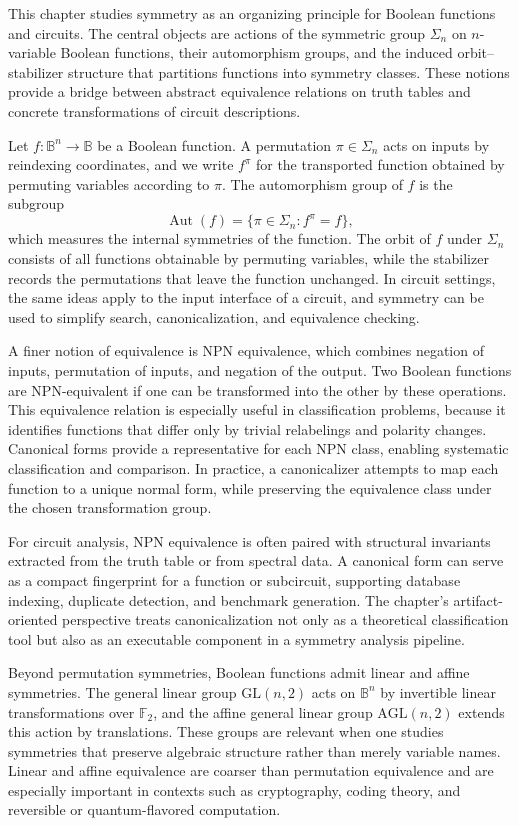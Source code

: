 This chapter studies symmetry as an organizing principle for Boolean functions and circuits. The central objects are actions of the symmetric group \(\Sigma_n\) on \(n\)-variable Boolean functions, their automorphism groups, and the induced orbit--stabilizer structure that partitions functions into symmetry classes. These notions provide a bridge between abstract equivalence relations on truth tables and concrete transformations of circuit descriptions.

Let \(f : \mathbb{B}^n \to \mathbb{B}\) be a Boolean function. A permutation \(\pi \in \Sigma_n\) acts on inputs by reindexing coordinates, and we write \(f^\pi\) for the transported function obtained by permuting variables according to \(\pi\). The automorphism group of \(f\) is the subgroup
\[
\operatorname{Aut}(f) = \{\pi \in \Sigma_n : f^\pi = f\},
\]
which measures the internal symmetries of the function. The orbit of \(f\) under \(\Sigma_n\) consists of all functions obtainable by permuting variables, while the stabilizer records the permutations that leave the function unchanged. In circuit settings, the same ideas apply to the input interface of a circuit, and symmetry can be used to simplify search, canonicalization, and equivalence checking.

A finer notion of equivalence is NPN equivalence, which combines negation of inputs, permutation of inputs, and negation of the output. Two Boolean functions are NPN-equivalent if one can be transformed into the other by these operations. This equivalence relation is especially useful in classification problems, because it identifies functions that differ only by trivial relabelings and polarity changes. Canonical forms provide a representative for each NPN class, enabling systematic classification and comparison. In practice, a canonicalizer attempts to map each function to a unique normal form, while preserving the equivalence class under the chosen transformation group.

For circuit analysis, NPN equivalence is often paired with structural invariants extracted from the truth table or from spectral data. A canonical form can serve as a compact fingerprint for a function or subcircuit, supporting database indexing, duplicate detection, and benchmark generation. The chapter's artifact-oriented perspective treats canonicalization not only as a theoretical classification tool but also as an executable component in a symmetry analysis pipeline.

Beyond permutation symmetries, Boolean functions admit linear and affine symmetries. The general linear group \(\mathrm{GL}(n,2)\) acts on \(\mathbb{B}^n\) by invertible linear transformations over \(\mathbb{F}_2\), and the affine general linear group \(\mathrm{AGL}(n,2)\) extends this action by translations. These groups are relevant when one studies symmetries that preserve algebraic structure rather than merely variable names. Linear and affine equivalence are coarser than permutation equivalence and are especially important in contexts such as cryptography, coding theory, and reversible or quantum-flavored computation.


